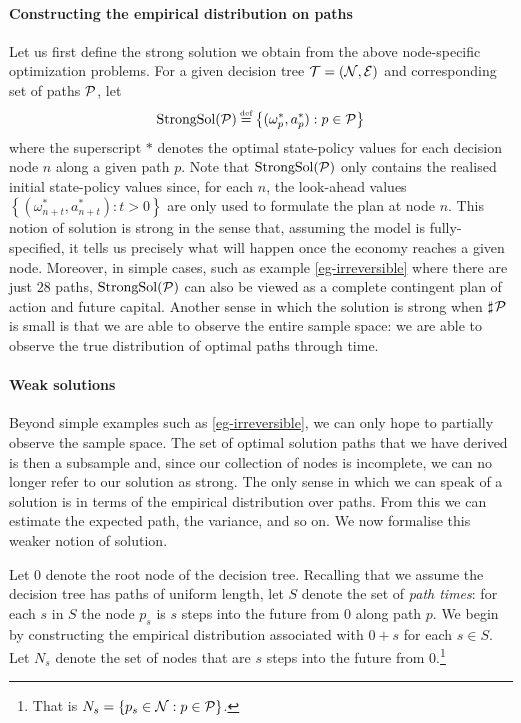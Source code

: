\documentclass[12pt,a4paper,twoside, draft]{article}
\begin{document}
\paragraph{Constructing the empirical distribution on paths}
Let us first define the strong solution we obtain from the above node-specific
optimization problems.
For a given decision tree $\mathcal T = (\mathcal N, \mathcal E)$ and corresponding set of
paths $\mathcal P$, let
\[
   \textup{StrongSol}(\mc P) \defeq \left\{
      (\omega^{*}_{p}, a^{*}_{p}) : p \in \mc P
   \right\}
\]
where the superscript $*$ denotes the optimal state-policy values
for each decision node $n$ along a given path $p$.
Note that $\textup{StrongSol}(\mathcal P)$ only contains the realised initial
state-policy values since, for each $n$, the look-ahead values
$\left\{(\omega^{*}_{n + t}, a^{*}_{n + t}) : t > 0 \right\}$ are only used to
formulate the plan at node $n$.
This notion of solution is strong in the sense that, assuming the model is
fully-specified, it tells us precisely what will happen once the economy
reaches a given node.
Moreover, in simple cases, such as example \ref{eg-irreversible} where there
are just $28$ paths, $\textup{StrongSol}(\mathcal P)$ can also be viewed as a
complete contingent plan of action and future capital.
Another sense in which the solution is strong when $\mathbin{\sharp}\hskip1pt \mathcal P$
is small is that we are able to observe the entire sample space: we are able to
observe the true distribution of optimal paths through time.

\paragraph{Weak solutions}
Beyond simple examples such as \cref{eg-irreversible}, we can only hope to
partially observe the sample space.
The set of optimal solution paths that we have derived is then a subsample and,
since our collection of nodes is incomplete, we can no longer refer to our
solution as strong.
The only sense in which we can speak of a solution is in terms of the empirical
distribution over paths. 
From this we can estimate the expected path, the variance, and so on.
We now formalise this weaker notion of solution.

Let $\mathfrak{0}$ denote the root node of the decision tree.
Recalling that we assume the decision tree has paths of uniform length, let $S$
denote the set of \emph{path times}: for each $s$ in $S$ the node $p_s$ is $s$
steps into the future from $\mathfrak{0}$ along path $p$.
We begin by constructing the empirical distribution associated with
$\mathfrak{0} + s$ for each $s \in S$.
Let $N_s$ denote the set of nodes that are $s$ steps into the future from
$\mathfrak{0}$.\footnote{
   That is $N_{s} = \left\{ p_{s} \in \mathcal N : p \in \mathcal P\right\}$.
}
\end{document}
